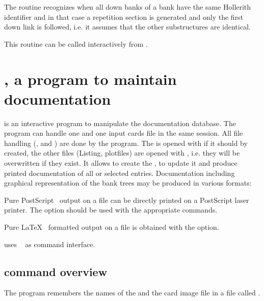 The routine recognizes when all down banks of a bank have the same
Hollerith identifier and in that case a repetition section is generated
and only the first down link is followed, i.e. it assumes that
the other substructures are identical.
 
This routine can be called interactively from .
 
\newpage

\section[{\tt DZEDIT}, a program to maintain documentation]%
        {, a program to maintain documentation}
\label{sec:dzdocdzedit}  
 
 is an interactive program to manipulate the documentation
database.
The program can handle one \RZfile{} and one input
cards file in the same session. 
All file handling (,  and ) 
are done by the program. 
The \RZfile{} is opened with  
if it should by created, the other files
(Listing, plotfiles) are opened with ,
i.e. they will be overwritten if they exist.
It allows to create the \RZfile,  to update it and
produce printed documentation of all or selected entries.
Documentation including graphical representation of the bank trees
may be produced in various formats:
 
\begin{ULc}
\item Pure PostScript~\cite{Adobe:red2} output on a file  can be
      directly printed on a PostScript laser printer.
      The  option should be used with the appropriate commands.
\item Pure \LaTeX~\cite{bib-LATEX} formatted output on a file  
      is obtained with the  option.
\end{ULc}
 
 uses ~\cite{bib-KUIP} as command interface. 
 
\subsection[{\tt DZEDIT} command overview]{ command overview}
The program remembers the names of the \RZfile{} and the card image
file in a file called .
 
 
